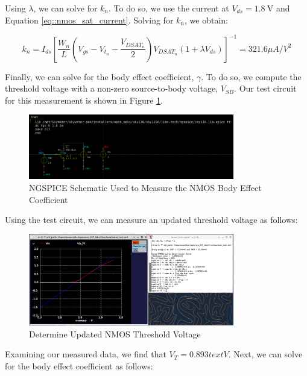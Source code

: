 \documentclass[fleqn]{article}
\begin{document}
	\noindent Using $\lambda$, we can solve for $k_n$. To do so, we use the current at $V_{ds}=1.8\ \text{V}$ and Equation \ref{eq::nmos_sat_current}. Solving for $k_n$, we obtain:
	
	\begin{equation}
		k_n = I_{ds}\left[\frac{W_n}{L}\left(V_{gs} - V_{t_n} - \frac{V_{DSAT_n}}{2}\right)V_{DSAT_n}(1 + {\lambda}V_{ds})\right]^{-1} = 321.6 {\mu}A/V^2
	\end{equation}
	
	Finally, we can solve for the body effect coefficient, $\gamma$. To do so, we compute the threshold voltage with a non-zero source-to-body voltage, $V_{SB}$. Our test circuit for this measurement is shown in Figure \ref{fig::nmos_gamma_meas_schem}.
	
	 \begin{figure}[H]
		\centerline{\includegraphics[width=0.8\textwidth]{nmos_gamma_meas_schem.png}}
		\caption{NGSPICE Schematic Used to Measure the NMOS Body Effect Coefficient}
		\label{fig::nmos_gamma_meas_schem}
	\end{figure}
	
	\noindent Using the test circuit, we can measure an updated threshold voltage as follows:
	
	\begin{figure}[H]
		\centerline{\includegraphics[width=0.8\textwidth]{nmos_gamma_meas.png}}
		\caption{Determine Updated NMOS Threshold Voltage}
		\label{fig::nmos_gamma_meas}
	\end{figure}
	
	\noindent Examining our measured data, we find that $V_T = 0.893 text{V}$. Next, we can solve for the body effect coefficient as follows:
	
\end{document}
